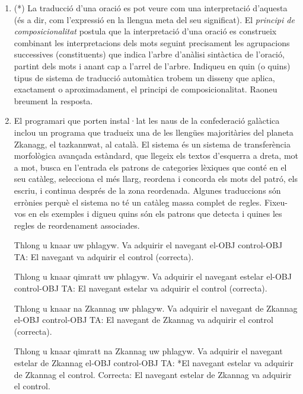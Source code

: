 \begin{enumerate}
    \item (*) La traducció d'una oració es pot veure com una interpretació
      d'aquesta (és a dir, com l'expressió en la llengua meta del seu
      significat). El \emph{principi de composicionalitat} postula que
      la interpretació d'una oració es construeix combinant les
      interpretacions dels mots seguint precisament les agrupacions
      successives (constituents) que indica l'arbre d'anàlisi
      sintàctica de l'oració, partint dels mots i anant cap a l'arrel
      de l'arbre. Indiqueu en quin (o quins) tipus de sistema de
      traducció automàtica trobem un disseny que aplica, exactament o
      aproximadament, el principi de composicionalitat. Raoneu
      breument la resposta.
      
    \item \label{ex:zkanagg} El programari que porten instal·lat les naus de la
      confederació galàctica inclou un programa que tradueix una de
      les llengües majoritàries del planeta Zkanagg, el tazkannwat, al
      català. El sistema és un sistema de transferència morfològica
      avançada estàndard, que llegeix els textos d'esquerra a dreta,
      mot a mot, busca en l'entrada els patrons de categories lèxiques
      que conté en el seu catàleg, selecciona el més llarg, reordena i
      concorda els mots del patró, els escriu, i continua després de
      la zona reordenada. Algunes traduccions són errònies perquè el
      sistema no té un catàleg massa complet de regles. Fixeu-vos en
      els exemples i digueu quins són els patrons que detecta i quines
      les regles de reordenament associades.
     \begin{example}
     \gll Thlong u knaar uw phlagyw.
          {Va adquirir} el navegant el-OBJ control-OBJ
     \glt TA: El navegant va adquirir el control (correcta).
     \glend
     \end{example}
     \begin{example}
     \gll Thlong u knaar qimratt uw phlagyw.
          {Va adquirir} el navegant estelar el-OBJ control-OBJ
     \glt TA: El navegant estelar va adquirir el control (correcta).
     \glend
     \end{example}
     \begin{example}
     \gll Thlong u knaar na Zkannag uw phlagyw.
          {Va adquirir} el navegant de Zkannag el-OBJ control-OBJ
     \glt TA: El navegant de Zkannag va adquirir el control (correcta).
     \glend
     \end{example}
     \begin{example}
     \gll Thlong u knaar qimratt na Zkannag uw phlagyw.
          {Va adquirir} el navegant estelar de Zkannag el-OBJ control-OBJ
     \glt TA: *El navegant estelar va adquirir de Zkannag el control.
     \glt Correcta: El navegant estelar de Zkannag va adquirir el control.
     \glend
     \end{example}



\end{enumerate}
